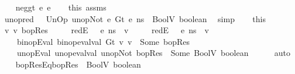 \begin{isabellebody}
\isamarkupfalse%
\isanewline
\ \ \isamarkupfalse%
\ {\isacharparenleft}{\kern0pt}neg{\isacharunderscore}{\kern0pt}gt\ e{}\ e{}{\isacharparenright}{\kern0pt}\isanewline
\ \ \isamarkupfalse%
\ this\ assms\ \isamarkupfalse%
\ unop{\isacharunderscore}{\kern0pt}red{\isacharcolon}{\kern0pt}\ {\isachardoublequoteopen}{\isasymLambda}{\isacharcomma}{\kern0pt}{\isasymGamma}{\isacharcomma}{\kern0pt}{\isasymOmega}\ {\isasymturnstile}\ {\isasymlangle}UnOp\ unop{\isachardot}{\kern0pt}Not\ {\isacharparenleft}{\kern0pt}e{}\ {\isasymguillemotleft}Gt{\isasymguillemotright}\ e{}{\isacharparenright}{\kern0pt}{\isacharcomma}{\kern0pt}\ ns{\isasymrangle}\ {\isasymDown}\ BoolV\ boolean{\isachardoublequoteclose}\ \isamarkupfalse%
\ simp\isanewline
\ \ \isamarkupfalse%
\ this\ \isamarkupfalse%
\ v{}\ v{}\ bopRes\ \isanewline
\ \ \ \ redE{}{\isacharcolon}{\kern0pt}\ {\isachardoublequoteopen}{\isasymLambda}{\isacharcomma}{\kern0pt}{\isasymGamma}{\isacharcomma}{\kern0pt}{\isasymOmega}\ {\isasymturnstile}\ {\isasymlangle}e{}{\isacharcomma}{\kern0pt}\ ns{\isasymrangle}\ {\isasymDown}\ v{}{\isachardoublequoteclose}\ \isanewline
\ \ \ \ redE{}{\isacharcolon}{\kern0pt}\ {\isachardoublequoteopen}{\isasymLambda}{\isacharcomma}{\kern0pt}{\isasymGamma}{\isacharcomma}{\kern0pt}{\isasymOmega}\ {\isasymturnstile}\ {\isasymlangle}e{}{\isacharcomma}{\kern0pt}\ ns{\isasymrangle}\ {\isasymDown}\ v{}{\isachardoublequoteclose}\ \isanewline
\ \ \ \ binopEval{\isacharcolon}{\kern0pt}\ {\isachardoublequoteopen}binop{\isacharunderscore}{\kern0pt}eval{\isacharunderscore}{\kern0pt}val\ Gt\ v{}\ v{}\ {\isacharequal}{\kern0pt}\ Some\ bopRes{\isachardoublequoteclose}\ \isanewline
\ \ \ \ unopEval{\isacharcolon}{\kern0pt}\ {\isachardoublequoteopen}unop{\isacharunderscore}{\kern0pt}eval{\isacharunderscore}{\kern0pt}val\ unop{\isachardot}{\kern0pt}Not\ bopRes\ {\isacharequal}{\kern0pt}\ Some\ {\isacharparenleft}{\kern0pt}BoolV\ boolean{\isacharparenright}{\kern0pt}{\isachardoublequoteclose}\isanewline
\ \ \ \ \isamarkupfalse%
\ auto\isanewline
\isanewline
\ \ \isamarkupfalse%
\ bopResEq{\isacharcolon}{\kern0pt}{\isachardoublequoteopen}bopRes\ {\isacharequal}{\kern0pt}\ BoolV\ {\isacharparenleft}{\kern0pt}{\isasymnot}boolean{\isacharparenright}{\kern0pt}{\isachardoublequoteclose}\ \isanewline

\end{isabellebody}
